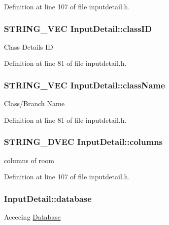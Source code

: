 Definition at line 107 of file inputdetail.\-h.

\hypertarget{classInputDetail_a67c823f91164f534250751ab8da7b7cf}{
\subsubsection[{class\-I\-D}]{\setlength{\rightskip}{0pt plus 5cm}S\-T\-R\-I\-N\-G\-\_\-\-V\-E\-C Input\-Detail\-::class\-I\-D\hspace{0.3cm}{\ttfamily [protected]}}}\label{classInputDetail_a67c823f91164f534250751ab8da7b7cf}
Class Details I\-D 

Definition at line 81 of file inputdetail.\-h.

\hypertarget{classInputDetail_a6ee80d01e417bea608374ba83e17b425}{
\subsubsection[{class\-Name}]{\setlength{\rightskip}{0pt plus 5cm}S\-T\-R\-I\-N\-G\-\_\-\-V\-E\-C Input\-Detail\-::class\-Name\hspace{0.3cm}{\ttfamily [protected]}}}\label{classInputDetail_a6ee80d01e417bea608374ba83e17b425}
Class/\-Branch Name 

Definition at line 81 of file inputdetail.\-h.

\hypertarget{classInputDetail_a8563f1b6c4d2e74a9b8421a12585395c}{
\subsubsection[{columns}]{\setlength{\rightskip}{0pt plus 5cm}S\-T\-R\-I\-N\-G\-\_\-D\-V\-E\-C Input\-Detail\-::columns\hspace{0.3cm}{\ttfamily [protected]}}}\label{classInputDetail_a8563f1b6c4d2e74a9b8421a12585395c}
columns of room 

Definition at line 107 of file inputdetail.\-h.

\hypertarget{classInputDetail_a479cd6c13833bd5de6e5630078c961b6}{
\subsubsection[{database}]{ Input\-Detail\-::database}}\label{classInputDetail_a479cd6c13833bd5de6e5630078c961b6}
Accecing \hyperlink{classDatabase}{Database} 

